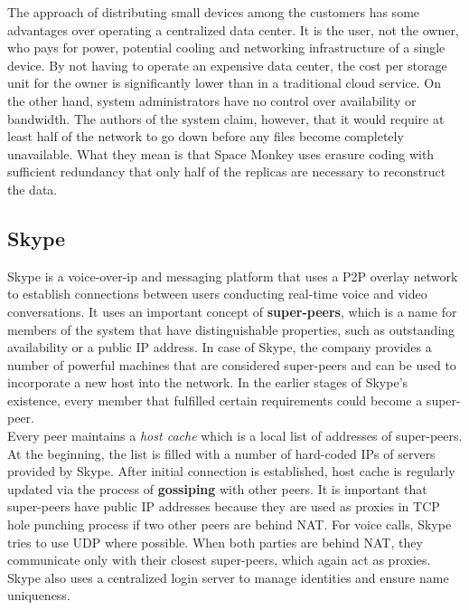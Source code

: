 \documentclass{pracamgren}
\begin{document}
The approach of distributing small devices among the customers has some advantages over operating a centralized data center. It is the user, not the owner, who pays for power, potential cooling and networking infrastructure of a single device. By not having to operate an expensive data center, the cost per storage unit for the owner is significantly lower than in a traditional cloud service. On the other hand, system administrators have no control over availability or bandwidth. The authors of the system claim, however, that it would require at least half of the network to go down before any files become completely unavailable. What they mean is that Space Monkey uses erasure coding with sufficient redundancy that only half of the replicas are necessary to reconstruct the data.\\

\subsection{Skype}

Skype \cite{skype} is a voice-over-ip and messaging platform that uses a P2P overlay network to establish connections between users conducting real-time voice and video conversations. It uses an important concept of {\bf super-peers}, which is a name for members of the system that have distinguishable properties, such as outstanding availability or a public IP address. In case of Skype, the company provides a number of powerful machines that are considered super-peers and can be used to incorporate a new host into the network. In the earlier stages of Skype's existence, every member that fulfilled certain requirements could become a super-peer.\\

Every peer maintains a {\it host cache} which is a local list of addresses of super-peers. At the beginning, the list is filled with a number of hard-coded IPs of servers provided by Skype. After initial connection is established, host cache is regularly updated via the process of {\bf gossiping} with other peers. It is important that super-peers have public IP addresses because they are used as proxies in TCP hole punching process \cite{skype_reverse} if two other peers are behind NAT. For voice calls, Skype tries to use UDP where possible. When both parties are behind NAT, they communicate only with their closest super-peers, which again act as proxies. Skype also uses a centralized login server to manage identities and ensure name uniqueness.\\
\end{document}
